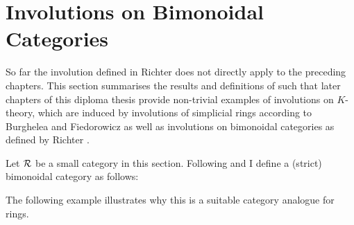 \chapter{Involutions on Bimonoidal Categories}
So far the involution defined in Richter \cite{richter2010involution} does not directly apply to the preceding chapters.
This section summarises the results and definitions of \cite{richter2010involution} such that later chapters
of this diploma thesis provide non-trivial examples of involutions on $K$-theory, which are induced by involutions of
simplicial rings according to Burghelea and Fiedorowicz \cite{BF} as well as
involutions on bimonoidal categories as defined by Richter \cite{richter2010involution}.

Let $\mathcal{R}$ be a small category in this section. Following \cite[Introduction of Chapter 2]{richter2010involution} and
 \cite[Definition 3.3]{elmendorf2006rings} I define a (strict) bimonoidal category as follows:

The following example illustrates why this is a suitable category analogue for rings.

